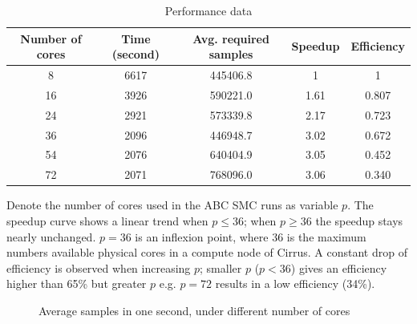 \begin{table}[H]
    \centering
    \begin{tabular}{|c c c c c|}
        \hline
        Number of cores & Time (second) & Avg. required samples & Speedup & Efficiency \\ [0.5ex]
        \hline\hline
        8               & 6617          & 445406.8              & 1       & 1          \\
        16              & 3926          & 590221.0              & 1.61    & 0.807      \\
        24              & 2921          & 573339.8              & 2.17    & 0.723      \\
        36              & 2096          & 446948.7              & 3.02    & 0.672      \\
        54              & 2076          & 640404.9              & 3.05    & 0.452      \\
        72              & 2071          & 768096.0              & 3.06    & 0.340      \\
        \hline
    \end{tabular}
    \caption{Performance data}
    \label{table:performance}
\end{table}

Denote the number of cores used in the ABC SMC runs as variable $p$. The speedup curve shows a linear trend when $p\leq 36$; when $p\geq 36$ the speedup stays nearly unchanged. $p=36$ is an inflexion point, where 36 is the maximum numbers available physical cores in a compute node of Cirrus. A constant drop of efficiency is observed when increasing $p$; smaller $p$ ($p<36$) gives an efficiency higher than 65\% but greater $p$ e.g. $p=72$ results in a low efficiency (34\%).

\begin{figure}[h]
    \begin{center}
    \end{center}

    \caption[Average samples in a second, under different number of cores]{Average samples in one second, under different number of cores}
    \label{fig:sample_per_sec}
\end{figure}

